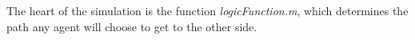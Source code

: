 
The heart of the simulation is the function \textit{logicFunction.m}, which determines the path any agent will choose to get to the other side.

